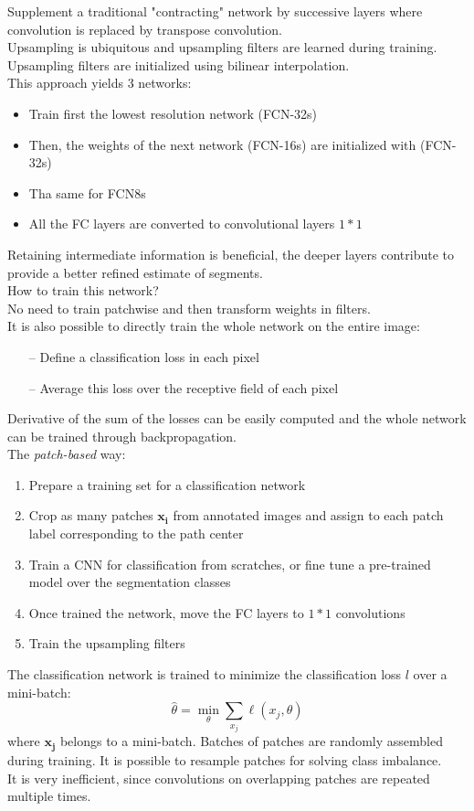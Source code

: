 Supplement a traditional "contracting" network by successive layers where convolution is replaced by transpose convolution. \\
Upsampling is ubiquitous and upsampling filters are learned during training. \\
Upsampling filters are initialized using bilinear interpolation. \\
This approach yields 3 networks:
\begin{itemize}
    \item Train first the lowest resolution network (FCN-32s)
    \item Then, the weights of the next network (FCN-16s) are initialized with (FCN-32s)
    \item Tha same for FCN8s
    \item All the FC layers are converted to convolutional layers $1*1$
\end{itemize}{}

Retaining intermediate information is beneficial, the deeper layers contribute to provide a better refined estimate of segments. \\

How to train this network? \\
No need to train patchwise and then transform weights in filters. \\
It is also possible to directly train the whole network on the entire image: 
\begin{itemize}
    \item[--] Define a classification loss in each pixel
    \item[--] Average this loss over the receptive field of each pixel
\end{itemize}{}
Derivative of the sum of the losses can be easily computed and the whole network can be trained through backpropagation. \\
The \textit{patch-based} way:
\begin{enumerate}
    \item Prepare a training set for a classification network
    \item Crop as many patches $\boldsymbol{x_i}$ from annotated images and assign to each patch label corresponding to the path center
    \item Train a CNN for classification from scratches, or fine tune a pre-trained model over the segmentation classes
    \item Once trained the network, move the FC layers to $1*1$ convolutions
    \item Train the upsampling filters
\end{enumerate}{}
The classification network is trained to minimize the classification loss $l$ over a mini-batch: 
$$
\hat{\theta}=\min _{\theta} \sum_{x_{j}} \ell\left(x_{j}, \theta\right)
$$
where $\boldsymbol{x_j}$ belongs to a mini-batch. Batches of patches are randomly assembled during training. It is possible to resample patches for solving class imbalance.\\
It is very inefficient, since convolutions on overlapping patches are repeated multiple times. 

